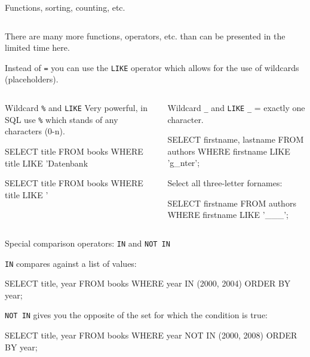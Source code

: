 \begin{frame}{Functions, sorting, counting, etc.}
\begin{columns}
\end{columns}

There are many more functions, operators, etc. than can be presented in the limited time here. 

\framebreak 

\footnotesize
Instead of \texttt{=} you can use the \texttt{LIKE} operator which allows for the use of wildcards (placeholders). 

\begin{columns}\footnotesize
{}
\begin{block}{Wildcard \texttt{\%} and \texttt{LIKE}}
Very powerful, in SQL use \texttt{\%} which stands of any characters (0-n).
\begin{sqlcode}
SELECT title
FROM books
WHERE title LIKE 'Datenbank %

SELECT title
FROM books
WHERE title LIKE '%
\end{sqlcode}
\end{block}

\begin{block}{Wildcard \texttt{\_} and \texttt{LIKE}}
\texttt{\_} = exactly one character.

\begin{sqlcode}
SELECT firstname, lastname
FROM authors
WHERE firstname LIKE 'g_nter';
\end{sqlcode}

Select all three-letter fornames:
\begin{sqlcode}
SELECT firstname
FROM authors
WHERE firstname LIKE '___';
\end{sqlcode}
\end{block}
\end{columns}

\begin{columns}\footnotesize
{}
\begin{block}{Special comparison operators: \texttt{IN} and \texttt{NOT IN}}
\footnotesize

\texttt{IN} compares against a list of values:

\begin{sqlcode}
SELECT title, year
FROM books
WHERE year IN (2000, 2004)
ORDER BY year;
\end{sqlcode}

\texttt{NOT IN} gives you the opposite of the set for which the condition is true:
\begin{sqlcode}
SELECT title, year
FROM books
WHERE year NOT IN (2000, 2008)
ORDER BY year;
\end{sqlcode}
\end{block}


\end{columns}
\end{frame}
